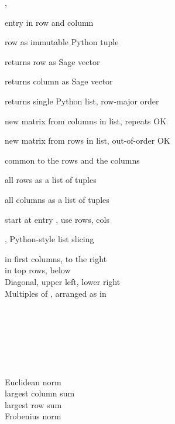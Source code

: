 \documentclass[a4paper]{article}
\begin{document}
\begin{multicols*}{3}


, 

 entry in row  and column   \BreakLineAndIndent
{}

row  as immutable Python tuple

returns row  as Sage vector

returns column  as Sage vector

returns single Python list, row-major order

 \BreakLineAndIndent
 new matrix from columns in list, repeats OK

\BreakLineAndIndent
new matrix from rows in list, out-of-order OK

 \BreakLineAndIndent
common to the rows and the columns

all rows as a list of tuples

all columns as a list of tuples

 \BreakLineAndIndent
start at entry , 
use  rows,  cols

,  
Python-style list slicing 


   in first columns,  to the right\\
   in top rows,  below\\
  Diagonal,  upper left,  lower right\\
  Multiples of , arranged as in 


\\
\\
\\
\\
\\
\\
 Euclidean norm\\
 largest column sum\\
 largest row sum\\
 Frobenius norm


\end{multicols*}
\end{document}
